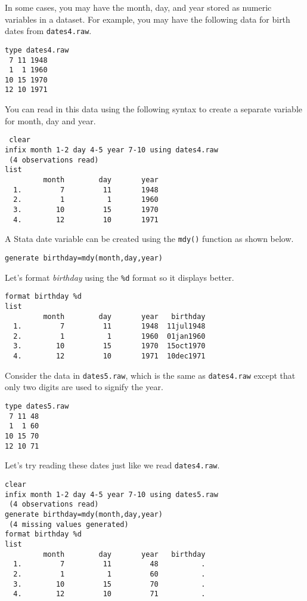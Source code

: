 In some cases, you may have the month, day, and year stored as numeric variables in a dataset. For example, you may have the following data for birth dates from \lstinline{dates4.raw}.

\begin{lstlisting}
type dates4.raw
 7 11 1948
 1  1 1960
10 15 1970
12 10 1971
\end{lstlisting}

You can read in this data using the following syntax to create a separate variable for month, day and year.

\begin{lstlisting}
 clear
infix month 1-2 day 4-5 year 7-10 using dates4.raw
 (4 observations read)
list
         month        day       year
  1.         7         11       1948
  2.         1          1       1960
  3.        10         15       1970
  4.        12         10       1971
 \end{lstlisting}

A Stata date variable can be created using the \lstinline{mdy()} function as shown below.

\begin{lstlisting}
generate birthday=mdy(month,day,year)
\end{lstlisting}

Let's format \textit{birthday} using the \lstinline{%d} format so it displays better.

\begin{lstlisting}
format birthday %d
list
         month        day       year   birthday
  1.         7         11       1948  11jul1948
  2.         1          1       1960  01jan1960
  3.        10         15       1970  15oct1970
  4.        12         10       1971  10dec1971
\end{lstlisting}

Consider the data in \lstinline{dates5.raw}, which is the same as \lstinline{dates4.raw} except that only two digits are used to signify the year.

\begin{lstlisting}
type dates5.raw
 7 11 48
 1  1 60
10 15 70
12 10 71
\end{lstlisting}

Let's try reading these dates just like we read \lstinline{dates4.raw}.

\begin{lstlisting}
clear
infix month 1-2 day 4-5 year 7-10 using dates5.raw
 (4 observations read)
generate birthday=mdy(month,day,year)
 (4 missing values generated)
format birthday %d
list
         month        day       year   birthday
  1.         7         11         48          .
  2.         1          1         60          .
  3.        10         15         70          .
  4.        12         10         71          .
\end{lstlisting}

